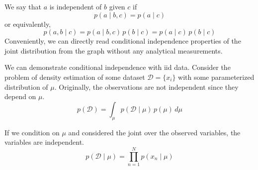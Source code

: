   \begin{definition}
    We say that $a$ is independent of $b$ given $c$ if 
    \[p(a \mid b, c) = p(a \mid c)\]
    or equivalently, 
    \[p(a, b \mid c) = p(a \mid b, c)\, p(b \mid c) = p(a \mid c) \, p(b \mid c)\]
    Conveniently, we can directly read conditional independence properties of the joint distribution from the graph without any analytical measurements. 
  \end{definition}

  \begin{example}
    We can demonstrate conditional independence with iid data. Consider the problem of density estimation of some dataset $\mathcal{D} = \{x_i\}$ with some parameterized distribution of $\mu$. Originally, the observations are not independent since they depend on $\mu$. 
    \begin{equation}
      p(\mathcal{D}) = \int_{\mu} p(\mathcal{D} \mid \mu) \, p(\mu)\, d\mu 
    \end{equation}

    \begin{figure}[H]
      \centering 
      \caption{}
      \label{fig:conditional_indep_iid_1}
    \end{figure}

    If we condition on $\mu$ and considered the joint over the observed variables, the variables are independent. 
    \begin{equation}
      p(\mathcal{D} \mid \mu) = \prod_{n=1}^N p(x_n \mid \mu)
    \end{equation}

    \begin{figure}[H]
      \centering 
\end{figure}
\end{example}
